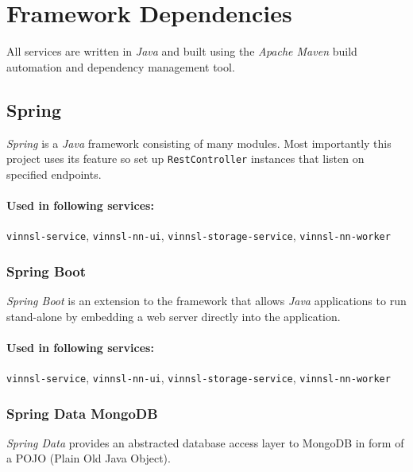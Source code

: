 \section{Framework Dependencies}\label{framework-dependencies}

All services are written in \emph{Java} and built using the \emph{Apache
Maven} build automation and dependency management tool.

\subsection{Spring}\label{spring}

\emph{Spring} is a \emph{Java} framework consisting of many modules.
Most importantly this project uses its feature so set up
\texttt{RestController} instances that listen on specified endpoints.

\paragraph{Used in following
services:}\label{used-in-following-services}

\texttt{vinnsl-service}, \texttt{vinnsl-nn-ui},
\texttt{vinnsl-storage-service}, \texttt{vinnsl-nn-worker}

\subsubsection{Spring Boot}\label{spring-boot}

\emph{Spring Boot} is an extension to the framework that allows
\emph{Java} applications to run stand-alone by embedding a web server
directly into the application. \cite{spring-boot}

\paragraph{Used in following
services:}\label{used-in-following-services-1}

\texttt{vinnsl-service}, \texttt{vinnsl-nn-ui},
\texttt{vinnsl-storage-service}, \texttt{vinnsl-nn-worker}

\subsubsection{Spring Data MongoDB}\label{spring-data-mongodb}

\emph{Spring Data} provides an abstracted database access layer to
MongoDB in form of a POJO (Plain Old Java Object). \cite{spring-data}


